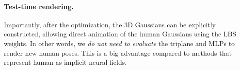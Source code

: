 \paragraph{Test-time rendering.} Importantly, after the optimization, the 3D Gaussians can be explicitly constructed, allowing direct animation of the human Gaussians using the LBS weights.
%
In other words, we \textit{do not need to evaluate} the triplane and MLPs to render new human poses. 
%
This is a big advantage compared to methods that represent human as implicit neural fields.






